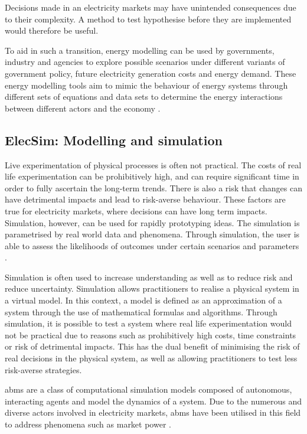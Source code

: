 Decisions made in an electricity markets may have unintended consequences due to their complexity. A method to test hypothesise before they are implemented would therefore be useful.

To aid in such a transition, energy modelling can be used by governments, industry and agencies to explore possible scenarios under different variants of government policy, future electricity generation costs and energy demand. These energy modelling tools aim to mimic the behaviour of energy systems through different sets of equations and data sets to determine the energy interactions between different actors and the economy \cite{Machado2019}.





\subsection{ElecSim: Modelling and simulation}




Live experimentation of physical processes is often not practical. The costs of real life experimentation can be prohibitively high, and can require significant time in order to fully ascertain the long-term trends. There is also a risk that changes can have detrimental impacts and lead to risk-averse behaviour. These factors are true for electricity markets, where decisions can have long term impacts. Simulation, however, can be used for rapidly prototyping ideas. The simulation is parametrised by real world data and phenomena. Through simulation, the user is able to assess the likelihoods of outcomes under certain scenarios and parameters \cite{Law:603360}.





Simulation is often used to increase understanding as well as to reduce risk and reduce uncertainty. Simulation allows practitioners to realise a physical system in a virtual model. In this context, a model is defined as an approximation of a system through the use of mathematical formulas and algorithms. Through simulation, it is possible to test a system where real life experimentation would not be practical due to reasons such as prohibitively high costs, time constraints or risk of detrimental impacts. This has the dual benefit of minimising the risk of real decisions in the physical system, as well as allowing practitioners to test less risk-averse strategies.

\acrfull{abm}s are a class of computational simulation models composed of autonomous, interacting agents and model the dynamics of a system. Due to the numerous and diverse actors involved in electricity markets, \acrshort{abm}s have been utilised in this field to address phenomena such as market power \cite{Ringler2016a}. 

